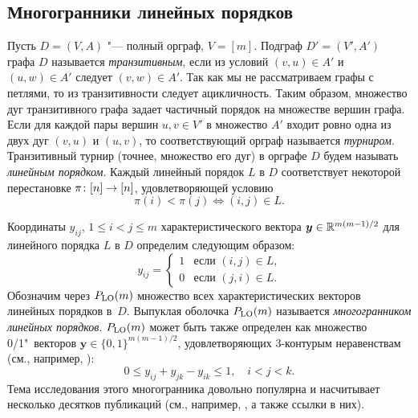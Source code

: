 \subsection{Многогранники линейных порядков}
\label{sec:LOP}

Пусть $D = (V, A)$ "--- полный орграф, $V = [m]$.
Подграф $D' = (V', A')$ графа $D$ называется \emph{транзитивным}, если из условий $(v, u) \in A'$ и $(u, w) \in A'$ следует $(v, w) \in A'$.
Так как мы не рассматриваем графы с петлями, то из транзитивности следует ацикличность.
Таким образом, множество дуг транзитивного графа задает частичный порядок на множестве вершин графа.
Если для каждой пары вершин $u,v \in V'$ в множество $A'$ входит ровно одна из двух дуг $(v, u)$ и $(u, v)$, то соответствующий орграф называется \emph{турниром}.
Транзитивный турнир (точнее, множество его дуг) в орграфе $D$ будем называть \emph{линейным порядком}. %
Каждый линейный порядок $L$ в $D$ соответствует некоторой перестановке $\pi \colon [n] \to [n]$, удовлетворяющей условию 
\begin{equation}
\label{eq:piLinear}
 \pi(i) < \pi(j) \iff (i,j) \in L.
\end{equation}

Координаты $y_{ij}$, $1 \le i < j \le m$ характеристического вектора $\bm{y} \in \mathbb{R}^{m(m-1)/2}$ для линейного порядка $L$ в $D$ определим следующим образом:
\[
y_{ij} = \begin{cases}
1 &\text{если $(i,j)\in L$,}\\
0 &\text{если $(j,i)\in L$.}
\end{cases}
\]
\label{def:LOP}
Обозначим через $P_{\textup{LO}}(m)$ множество всех характеристических векторов линейных порядков в~$D$.
Выпуклая оболочка $P_{\textup{LO}}(m)$ называется \emph{многогранником линейных порядков}. 
$P_{\textup{LO}}(m)$ может быть также определен как множество 0/1"~векторов $\bm{y}\in\{0,1\}^{m(m-1)/2}$, удовлетворяющих 3-контурым неравенствам (см., например, \cite{Grotschel:1985}):
\begin{equation}
\label{3cycle}
0 \le y_{ij} + y_{jk} - y_{ik} \le 1, \quad i < j < k.
\end{equation}
Тема исследования этого многогранника довольно популярна и насчитывает нес\-коль\-ко десятков публикаций (см., например, \cite{Doignon:2009,Kovalev:2012}, а также ссылки в них).

